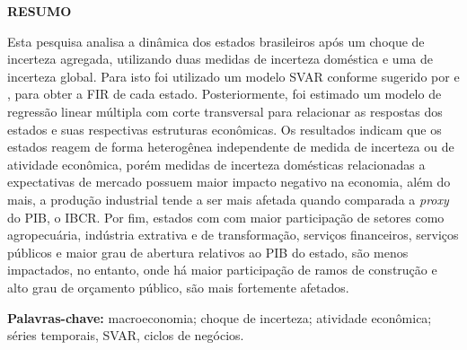 \begin{center}
    \textbf{\uppercase{Resumo}}
\end{center}
\vspace*{1.5cm}


Esta pesquisa analisa a dinâmica dos estados brasileiros após um choque de incerteza agregada, utilizando duas medidas de incerteza doméstica e uma de incerteza global. Para isto foi utilizado um modelo \gls{SVAR} conforme sugerido por  e , para obter a \gls{FIR} de cada estado. Posteriormente, foi estimado um modelo de regressão linear múltipla com corte transversal para relacionar as respostas dos estados e suas respectivas estruturas econômicas. Os resultados indicam que os estados reagem de forma heterogênea independente de medida de incerteza ou de atividade econômica, porém medidas de incerteza domésticas relacionadas a expectativas de mercado possuem maior impacto negativo na economia, além do mais, a produção industrial tende a ser mais afetada quando comparada a \textit{proxy} do \gls{PIB}, o \gls{IBCR}. Por fim, estados com com maior participação de setores como agropecuária, indústria extrativa e de transformação, serviços financeiros, serviços públicos e maior grau de abertura relativos ao \gls{PIB} do estado, são menos impactados, no entanto, onde há maior participação de ramos de construção e alto grau de orçamento público, são mais fortemente afetados.

\vspace*{1.5cm}
\noindent \textbf{Palavras-chave:}  macroeconomia; choque de incerteza; atividade econômica; séries temporais, SVAR, ciclos de negócios.

\thispagestyle{empty}